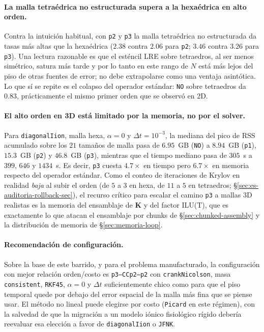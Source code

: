 \documentclass[11pt,a4paper]{article}
\newcommand{\code}[1]{\texttt{\small #1}}
\newcommand{\Kstif}{\mathbf{K}}
\begin{document}
\paragraph{La malla tetraédrica no estructurada supera a la hexaédrica en alto orden.}
Contra la intuición habitual, con \code{p2} y \code{p3} la malla tetraédrica no estructurada da
tasas más altas que la hexaédrica ($2.38$ contra $2.06$ para \code{p2}; $3.46$ contra $3.26$
para \code{p3}). Una lectura razonable es que el esténcil LRE sobre tetraedros, al ser menos
simétrico, satura más tarde y por lo tanto en este rango de $N$ está más lejos del piso de otras
fuentes de error; no debe extrapolarse como una ventaja asintótica. Lo que sí se repite es el
colapso del operador estándar: \code{NO} sobre tetraedros da $0.83$, prácticamente el mismo
primer orden que se observó en 2D.

\paragraph{El alto orden en 3D está limitado por la memoria, no por el solver.}
Para \code{diagonalIion}, malla hexa, $\alpha=0$ y $\Delta t=10^{-3}$, la mediana del pico de
RSS acumulado sobre los $21$ tamaños de malla pasa de $6.95$~GB (\code{NO}) a $8.94$~GB
(\code{p1}), $15.3$~GB (\code{p2}) y $46.8$~GB (\code{p3}), mientras que el tiempo mediano pasa
de $305$~s a $399$, $646$ y $1434$~s. Es decir, \code{p3} cuesta $4.7\times$ en tiempo pero
$6.7\times$ en memoria respecto del operador estándar. Como el conteo de iteraciones de Krylov
en realidad \emph{baja} al subir el orden (de $5$ a $3$ en hexa, de $11$ a $5$ en tetraedros;
\S\ref{sec:es-auditoria-rollback-sec}), el recurso crítico para escalar el camino \code{p3} a
mallas 3D realistas es la memoria del ensamblaje de $\Kstif$ y del factor ILU(T), que es
exactamente lo que atacan el ensamblaje por chunks de \S\ref{sec:chunked-assembly} y la
distribución de memoria de \S\ref{sec:memoria-loop}.

\paragraph{Recomendación de configuración.}
Sobre la base de este barrido, y para el problema manufacturado, la configuración con mejor
relación orden/costo es \code{p3--CCp2--p2} con \code{crankNicolson}, masa \code{consistent},
\code{RKF45}, $\alpha=0$ y $\Delta t$ suficientemente chico como para que el piso temporal quede
por debajo del error espacial de la malla más fina que se piense usar. El método no lineal puede
elegirse por costo (\code{Picard} en este régimen), con la salvedad de que la migración a un
modelo iónico fisiológico rígido debería reevaluar esa elección a favor de \code{diagonalIion} o
\code{JFNK}.
\end{document}
